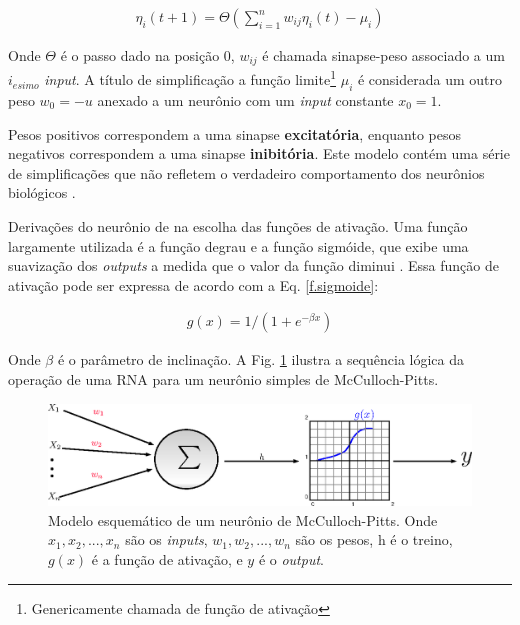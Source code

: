 \begin{eqnarray}
\eta_{i}(t+1)=\Theta \left( \sum^{n}_{i=1} w_{ij} \eta_{i}(t) -\mu_{i} \right)
\label{Eq.neuronio-McCulloch}
\end{eqnarray}



Onde $\Theta$ é o passo dado na posição $0$, $w_{ij}$ é chamada sinapse-peso associado a um $i_{esimo}$ \textit{input}. A título de simplificação a função limite\footnote{Genericamente chamada de função de ativação} $\mu_{i}$ é considerada um outro peso $w_{0}=-u$ anexado a um neurônio com um \textit{input} constante $x_{0}=1$. 

Pesos positivos correspondem a uma sinapse \textbf{excitatória}, enquanto pesos negativos correspondem a uma sinapse \textbf{inibitória}. Este modelo contém uma série de simplificações que não refletem o verdadeiro comportamento dos neurônios biológicos \citep{Mao1996}.  

Derivações do neurônio de \citet{McCulloch1943} na escolha das funções de ativação. Uma função largamente utilizada é a função degrau e a função sigmóide, que exibe uma suavização dos \textit{outputs} a medida que o valor da função diminui \citep{Mao1996,Misra2010}. Essa função de ativação pode ser expressa de acordo com a Eq. \ref{f.sigmoide}:

\begin{eqnarray}
g(x)=1/(1+e^{-\beta x})
\label{f.sigmoide}
\end{eqnarray}

Onde $\beta$ é o parâmetro de inclinação. A Fig. \ref{Esquematico de McCulloch} ilustra a sequência lógica da operação de uma RNA para um neurônio simples de McCulloch-Pitts. 
\\
\begin{figure}[H]
	\centering
		\includegraphics[scale=0.7]{Imagens/McCulloch.eps}
	\caption{Modelo esquemático de um neurônio de McCulloch-Pitts. Onde $x_{1}, x_{2}, ..., x_{n}$ são os \textit{inputs}, $w_{1}, w_{2}, ..., w_{n}$ são os pesos, h é o treino, $g(x)$ é a função de ativação, e $y$ é o \textit{output}.}
	\label{Esquematico de McCulloch}
\end{figure}

